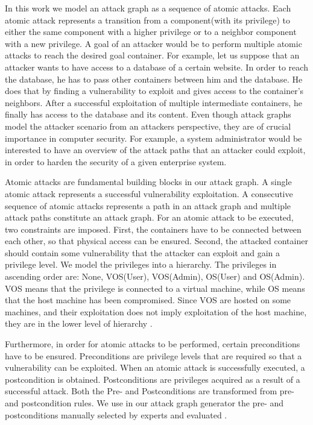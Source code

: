 In this work we model an attack graph as a sequence of atomic attacks. Each atomic attack represents a transition from a component(with its privilege) to either the same component with a higher privilege or to a neighbor component with a new privilege. A goal of an attacker would be to perform multiple atomic attacks to reach the desired goal container. For example, let us suppose that an attacker wants to have access to a database of a certain website. In order to reach the database, he has to pass other containers between him and the database. He does that by finding a vulnerability to exploit and gives access to the container's neighbors. After a successful exploitation of multiple intermediate containers, he finally has access to the database and its content. Even though attack graphs model the attacker scenario from an attackers perspective, they are of crucial importance in computer security. For example, a system administrator would be interested to have an overview of the attack paths that an attacker could exploit, in order to harden the security of a given enterprise system.

Atomic attacks are fundamental building blocks in our attack graph. A single atomic attack represents a successful vulnerability exploitation. A consecutive sequence of atomic attacks represents a path in an attack graph and multiple attack paths constitute an attack graph. For an atomic attack to be executed, two constraints are imposed. First, the containers have to be connected between each other, so that physical access can be ensured. Second, the attacked container should contain some vulnerability that the attacker can exploit and gain a privilege level. We model the privileges into a hierarchy. The privileges in ascending order are: None, VOS(User), VOS(Admin), OS(User) and OS(Admin). VOS means that the privilege is connected to a virtual machine, while OS means that the host machine has been compromised. Since VOS are hosted on some machines, and their exploitation does not imply exploitation of the host machine, they are in the lower level of hierarchy \cite{aksu2018automated}.

Furthermore, in order for atomic attacks to be performed, certain preconditions have to be ensured. Preconditions are privilege levels that are required so that a vulnerability can be exploited. When an atomic attack is successfully executed, a postcondition is obtained. Postconditions are privileges acquired as a result of a successful attack. Both the Pre- and Postconditions are transformed from pre- and postcondition rules. We use in our attack graph generator the pre- and postconditions manually selected by experts and evaluated \cite{aksu2018automated}.

